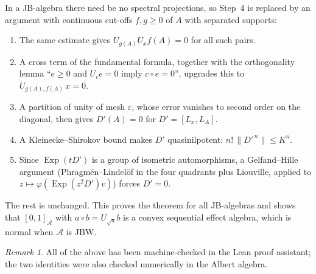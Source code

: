 \documentclass[11pt]{article}
\theoremstyle{remark}
\newtheorem*{remark}{Remark}
\newcommand{\jp}{\circ}
\DeclareMathOperator{\Exp}{Exp}
\begin{document}
In a JB-algebra there need be no spectral projections, so Step~4 is replaced
by an argument with continuous cut-offs $f,g\geq0$ of $A$ with separated
supports:
\begin{enumerate}
\item The same estimate gives $U_{g(A)}U_x f(A) = 0$ for all such pairs.
\item A cross term of the fundamental formula, together with the orthogonality
  lemma ``$e\geq0$ and $U_c e=0$ imply $c\jp e=0$'', upgrades this to
  $U_{g(A),f(A)}\,x = 0$.
\item A partition of unity of mesh $\varepsilon$, whose error vanishes to second
  order on the diagonal, then gives $D'(A)=0$ for $D'=[L_x,L_A]$.
\item A Kleinecke--Shirokov bound makes $D'$ quasinilpotent:
  $n!\,\|D'^{\,n}\|\leq K^n$.
\item Since $\Exp(tD')$ is a group of isometric automorphisms, a
  Gelfand--Hille argument (Phragm\'en--Lindel\"of in the four quadrants plus
  Liouville, applied to $z\mapsto \varphi(\Exp(z^2 D')v)$) forces $D'=0$.
\end{enumerate}
The rest is unchanged. This proves the theorem for all JB-algebras and
shows that $[0,1]_{\mathcal A}$ with $a\jp b = U_{\sqrt a} b$ is a convex
sequential effect algebra, which is normal when $\mathcal A$ is JBW.

\begin{remark}
All of the above has been machine-checked in the Lean proof assistant; the
two identities were also checked numerically in the Albert algebra.
\end{remark}
\end{document}
